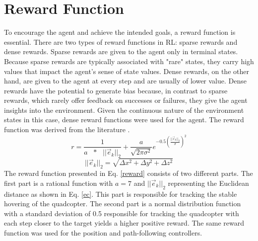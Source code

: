     \section{Reward Function}
    To encourage the agent and achieve the intended goals, a reward function is essential. There are two types of reward functions in RL: sparse rewards and dense rewards. Sparse rewards are given to the agent only in terminal states. Because sparse rewards are typically associated with "rare" states, they carry high values that impact the agent's sense of state values. Dense rewards, on the other hand, are given to the agent at every step and are usually of lower value. Dense rewards have the potential to generate bias because, in contrast to sparse rewards, which rarely offer feedback on successes or failures, they give the agent insights into the environment. Given the continuous nature of the environment states in this case, dense reward functions were used for the agent. The reward function was derived from the literature \cite{Mokhtar}.
    \begin{equation}
    r = \frac{1}{a \text{  }* \text{  }||\vec{e}_{k}||_{2}} + \frac{a}{\sqrt{2\pi \sigma^2}} e^{-0.5(\frac{||\vec{e}_{k}||_{2}}{\sigma})^2}
    \label{reward}
    \end{equation}
    \begin{equation}
    ||\vec{e}_{k}||_{2} = \sqrt{\Delta x^2 + \Delta y^2 + \Delta z^2}
    \label{ec}
    \end{equation}
    The reward function presented in Eq. \ref{reward} consists of two different parts. The first part is a rational function with $a = 7$ and $||\vec{e}_{k}||_{2}$ representing the Euclidean distance as shown in Eq. \ref{ec}. This part is responsible for tracking the stable hovering of the quadcopter. The second part is a normal distribution function with a standard deviation of 0.5 responsible for tracking the quadcopter with each step closer to the target yields a higher positive reward. The same reward function was used for the position and path-following controllers.\clearpage
